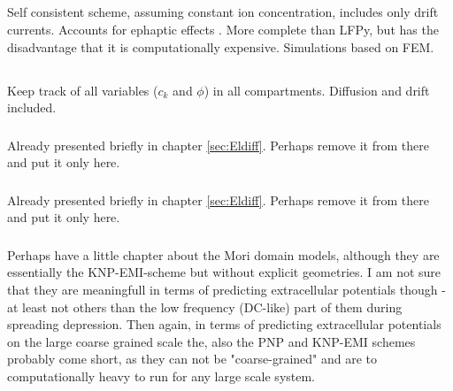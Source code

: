 \subsection{}
Self consistent scheme, assuming constant ion concentration, includes only drift currents. Accounts for ephaptic effects \cite{Tveito2019}. More complete than LFPy, but has the disadvantage that it is computationally expensive. Simulations based on FEM.


\subsection{}
Keep track of all variables ($c_k$ and $\phi$) in all compartments. Diffusion and drift included. 

\subsubsection{}
Already presented briefly in chapter \ref{sec:Eldiff}. Perhaps remove it from there and put it only here. 

\subsubsection{}
Already presented briefly in chapter \ref{sec:Eldiff}. Perhaps remove it from there and put it only here. 

\subsubsection{}
Perhaps have a little chapter about the Mori domain models, although they are essentially the KNP-EMI-scheme but without explicit geometries. I am not sure that they are meaningfull in terms of predicting extracellular potentials though - at least not others than the low frequency (DC-like) part of them during spreading depression. Then again, in terms of predicting extracellular potentials on the large coarse grained scale the, also the PNP and KNP-EMI schemes probably come short, as they can not be "coarse-grained" and are to computationally heavy to run for any large scale system. 



